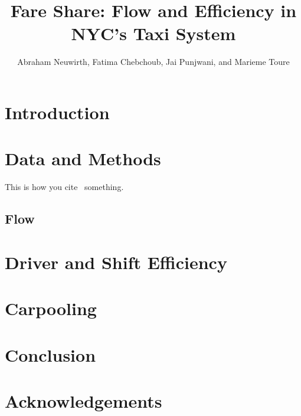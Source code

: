 \documentclass[]{article}
\title{Fare Share: Flow and Efficiency in NYC's Taxi System}
\author{Abraham Neuwirth, Fatima Chebchoub, Jai Punjwani, and Marieme Toure}
\date{\vspace{-5ex}}
\begin{document}
\maketitle


\section{Introduction}




\section{Data and Methods}
This is how you cite~\cite{Farber:2014} something.

\subsection{Flow}

\section{Driver and Shift Efficiency}

\section{Carpooling}

\section{Conclusion}

\section{Acknowledgements}

\vspace{-0.5em}


\end{document}
